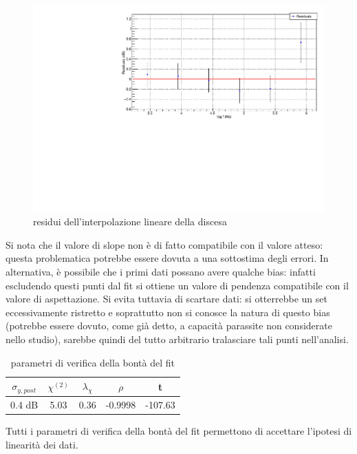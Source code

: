 \documentclass{article}
\begin{document}
\begin{center}
    \begin{figure}[H]
    \centering
    \includegraphics[scale=0.4, angle=0]{residuipreamplineare.pdf}
    \caption{residui dell'interpolazione lineare della discesa}
    \label{fig:bodepreamp_res}
    \end{figure}
\end{center}

Si nota che il valore di slope non è di fatto
compatibile con il valore atteso: questa
problematica potrebbe essere dovuta a una sottostima degli
errori. In alternativa, è possibile che i primi dati possano
avere qualche bias: infatti escludendo questi punti dal fit si
ottiene un valore di pendenza compatibile con il valore di
aspettazione. Si evita tuttavia di scartare dati: si otterrebbe
un set eccessivamente ristretto e soprattutto non si conosce
la natura di questo bias (potrebbe essere dovuto, come già detto, a
capacità parassite non considerate nello studio),
 sarebbe quindi del tutto arbitrario
tralasciare tali punti nell’analisi.

\begin{table}[ht]
    \centering
    \begin{tabular}{ccccc}
        \toprule
        $\sigma_{y, post}$    &$\chi^{(2)}$    &$\lambda_{\chi}$   &$\rho$ &t      \\
        \midrule
        0.4 dB                &5.03            &0.36               &-0.9998&-107.63\\
        \bottomrule
    \end{tabular}
    \caption{parametri di verifica della bontà del fit}
\end{table}
Tutti i parametri di verifica della bontà del fit permettono di accettare
l'ipotesi di linearità dei dati.
\end{document}
